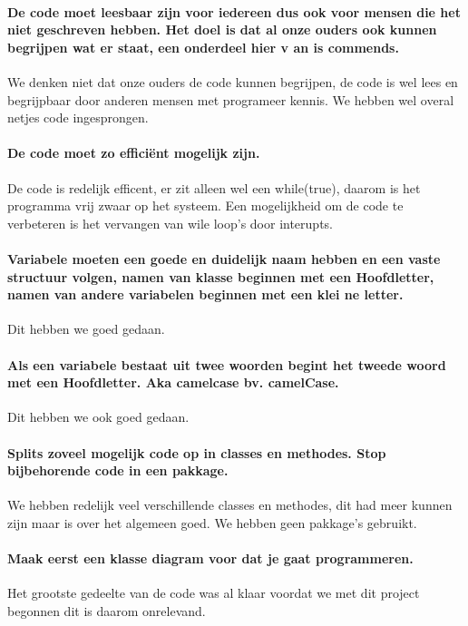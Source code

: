 \documentclass{article}
\begin{document}
\paragraph{De code moet leesbaar zijn voor iedereen dus ook voor mensen die het niet geschreven hebben. Het doel is dat al onze ouders ook kunnen begrijpen wat er staat, een onderdeel hier v
an is commends.}
We denken niet dat onze ouders de code kunnen begrijpen, de code is wel lees en begrijpbaar door anderen mensen met programeer kennis. We hebben wel overal netjes code ingesprongen.

\paragraph{De code moet zo efficiënt mogelijk zijn.}
De code is redelijk efficent, er zit alleen wel een while(true), daarom is het programma vrij zwaar op het systeem. Een mogelijkheid om de code te verbeteren is het vervangen van wile loop's
 door interupts.

\paragraph{Variabele moeten een goede en duidelijk naam hebben en een vaste structuur volgen, namen van klasse beginnen met een Hoofdletter, namen van andere variabelen beginnen met een klei
ne letter.}
Dit hebben we goed gedaan.

\paragraph{Als een variabele bestaat uit twee woorden begint het tweede woord met een Hoofdletter. Aka camelcase bv. camelCase.}
Dit hebben we ook goed gedaan.

\paragraph{Splits zoveel mogelijk code op in classes en methodes. Stop bijbehorende code in een pakkage.}
We hebben redelijk veel verschillende classes en methodes, dit had meer kunnen zijn maar is over het algemeen goed. We hebben geen pakkage's gebruikt.

\paragraph{Maak eerst een klasse diagram voor dat je gaat programmeren.}
Het grootste gedeelte van de code was al klaar voordat we met dit project begonnen dit is daarom onrelevand.
\end{document}
